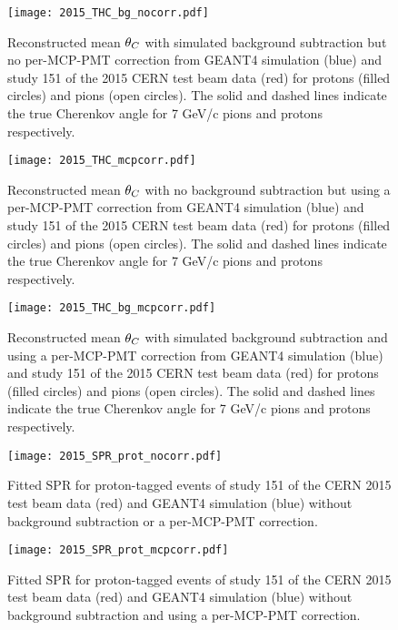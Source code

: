 \begin{figure}[!htb]
	\centering
	\texttt{[image: 2015\_THC\_bg\_nocorr.pdf]}
	\caption{Reconstructed mean $\theta_{C}$ with simulated background subtraction but no per-MCP-PMT correction from GEANT4 simulation (blue) and study 151 of the 2015 CERN test beam data (red) for protons (filled circles) and pions (open circles). The solid and dashed lines indicate the true Cherenkov angle for 7 GeV/c pions and protons respectively.}
	\label{fig:2015_THC_bg_nocorr}
\end{figure}

\begin{figure}[!htb]
	\centering
	\texttt{[image: 2015\_THC\_mcpcorr.pdf]}
	\caption{Reconstructed mean $\theta_{C}$ with no background subtraction but using a per-MCP-PMT correction from GEANT4 simulation (blue) and study 151 of the 2015 CERN test beam data (red) for protons (filled circles) and pions (open circles). The solid and dashed lines indicate the true Cherenkov angle for 7 GeV/c pions and protons respectively.}
	\label{fig:2015_THC_mcpcorr}
\end{figure}

\begin{figure}[!htb]
	\centering
	\texttt{[image: 2015\_THC\_bg\_mcpcorr.pdf]}
	\caption{Reconstructed mean $\theta_{C}$ with simulated background subtraction and using a per-MCP-PMT correction from GEANT4 simulation (blue) and study 151 of the 2015 CERN test beam data (red) for protons (filled circles) and pions (open circles). The solid and dashed lines indicate the true Cherenkov angle for 7 GeV/c pions and protons respectively.}
	\label{fig:2015_THC_bg_mcpcorr}
\end{figure}

\begin{figure}[!htb]
	\centering
	\texttt{[image: 2015\_SPR\_prot\_nocorr.pdf]}
	\caption{Fitted SPR for proton-tagged events of study 151 of the CERN 2015 test beam data (red) and GEANT4 simulation (blue) without background subtraction or a per-MCP-PMT correction.}
	\label{fig:2015_SPR_prot_nocorr}
\end{figure}

\begin{figure}[!htb]
	\centering
	\texttt{[image: 2015\_SPR\_prot\_mcpcorr.pdf]}
	\caption{Fitted SPR for proton-tagged events of study 151 of the CERN 2015 test beam data (red) and GEANT4 simulation (blue) without background subtraction and using a per-MCP-PMT correction.}
	\label{fig:2015_SPR_prot_mcpcorr}
\end{figure}


